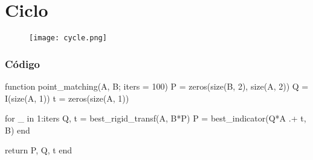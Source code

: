 
\section{Ciclo}

\begin{frame}
  \begin{figure}
    \centering
    \texttt{[image: cycle.png]}
  \end{figure}
\end{frame}

\begin{frame}[fragile]
  \frametitle{Código}
  \begin{code}
    function point_matching(A, B; iters = 100)
      P = zeros(size(B, 2), size(A, 2))
      Q = I(size(A, 1))
      t = zeros(size(A, 1))

      for _ in 1:iters
        Q, t = best_rigid_transf(A, B*P)
        P = best_indicator(Q*A .+ t, B)
      end

      return P, Q, t
    end
  \end{code}
\end{frame}
